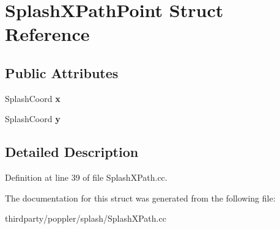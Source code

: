 \hypertarget{struct_splash_x_path_point}{}\section{Splash\+X\+Path\+Point Struct Reference}
\label{struct_splash_x_path_point}
\subsection*{Public Attributes}
\begin{DoxyCompactItemize}
\item 
\mbox{\label{struct_splash_x_path_point_a3e7c7d5874e4ff362d88c4372df2e053}} 
Splash\+Coord {\bfseries x}
\item 
\mbox{\label{struct_splash_x_path_point_ad7bd0a0879655dc0f5f2851f5951dc27}} 
Splash\+Coord {\bfseries y}
\end{DoxyCompactItemize}


\subsection{Detailed Description}


Definition at line 39 of file Splash\+X\+Path.\+cc.



The documentation for this struct was generated from the following file\+:\begin{DoxyCompactItemize}
\item 
thirdparty/poppler/splash/Splash\+X\+Path.\+cc\end{DoxyCompactItemize}
